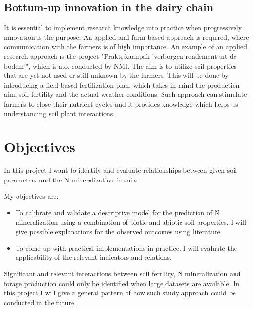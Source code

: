 \documentclass[10pt,twoside,dutch,english]{report}
\begin{document}
		\subsection{Bottum-up innovation in the dairy chain}
		 It is essential to implement research knowledge into practice when progressively innovation is the purpose. An applied and farm based approach is required, where communication with the farmers is of high importance. An example of an applied research approach is the project "Praktijkaanpak 'verborgen rendement uit de bodem'", which is a.o. conducted by NMI. The aim is to utilize soil properties that are yet not used or still unknown by the farmers. This will be done by introducing a field based fertilization plan, which takes in mind the production aim, soil fertility and the actual weather conditions. Such approach can stimulate farmers to close their nutrient cycles and it provides knowledge which helps us understanding soil plant interactions. 
		
	\section{Objectives}
			In this project I want to identify and evaluate relationships between given soil parameters and the N mineralization in soils.
			
			
			My objectives are:
			\begin{itemize}
				\item   To calibrate and validate a descriptive model for the prediction of N mineralization using a combination of biotic and abiotic soil properties. I will give possible explanations for the observed outcomes using literature.
				\item	To come up with practical implementations in practice. I will evaluate the applicability of the relevant indicators and relations.
				
			\end{itemize}
			
			Significant and relevant interactions between soil fertility, N mineralization and forage production could only be identified when large datasets are available. In this project I will give a general pattern of how such study approach could be conducted in the future. 
			

		
		
		
		
		
		
		
		
\end{document}
